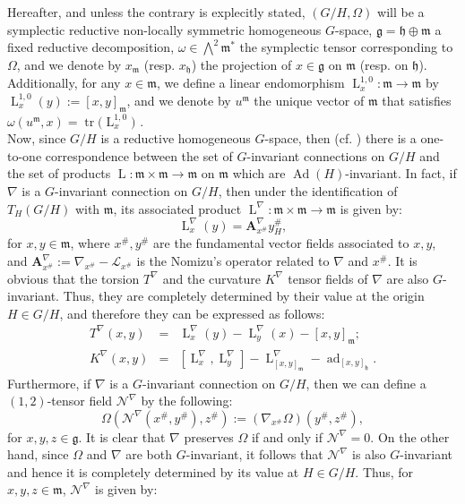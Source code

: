 \documentclass[preprint,12pt,1p]{elsarticle}
\theoremstyle{plain}
\theoremstyle{definition}
\newcommand{\n}{\nabla}
\newcommand{\el}{\operatorname{L}}
\newcommand{\tr}{\operatorname{tr}}
\newcommand{\A}{\mathbf{A}}
\newcommand{\g}{\mathfrak{g}}
\newcommand{\h}{\mathfrak{h}}
\newcommand{\m}{\mathfrak{m}}
\newcommand{\Ad}{\operatorname{Ad}}
\newcommand{\ad}{\operatorname{ad}}
\newcommand{\lN}{\operatorname{L}^\n}
\newcommand{\Ll}{\operatorname{L}}
\newcommand{\lm}{\operatorname{L}^{1,0}}
\numberwithin{equation}{section}
\begin{document}
Hereafter, and unless the contrary is explecitly stated, $(G/H,\Omega)$ will be a symplectic reductive non-locally symmetric homogeneous $G$-space, $\mathfrak{g}=\mathfrak{h}\oplus\mathfrak{m}$ a fixed reductive decomposition, $\omega\in\bigwedge^2\m^*$ the symplectic tensor corresponding to $\Omega$, and we denote by $x_\mathfrak{m}$ (resp. $x_\h$) the projection of $x\in\g$ on $\mathfrak{m}$ (resp. on $\h$). Additionally, for any $x\in\mathfrak{m}$, we define a linear endomorphism $\lm_x:\mathfrak{m}\to\mathfrak{m}$ by $\lm_x(y):=[x,y]_\mathfrak{m}$, and we denote by $u^\mathfrak{m}$ the unique vector of $\m$ that satisfies $\omega\left(u^\mathfrak{m},x\right)=\tr\big(\el_x^{1,0})$ .\\

Now, since $G/H$ is a reductive homogeneous $G$-space, then (cf. \cite{Nom1}) there is a one-to-one correspondence between the set of $G$-invariant connections on $G/H$ and the set of products $\Ll:\mathfrak{m}\times\mathfrak{m}\rightarrow\mathfrak{m}$ on $\m$ which are $\Ad(H)$-invariant. In fact, if $\n$ is a $G$-invariant connection on $G/H$, then under the identification of $T_H(G/H)$ with $\mathfrak{m}$, its associated product $\Ll^\n:\mathfrak{m}\times\mathfrak{m}\rightarrow\mathfrak{m}$ is given by:
\begin{equation}
\Ll^\n_x(y)=\A^\n_{x^\#}y^\#_H,
\end{equation}    
for $x,y\in\mathfrak{m}$, where $x^\#,y^\#$ are the fundamental vector fields associated to $x,y$, and $\A^\n_{x^\#}:=\n_{x^\#}-\mathcal{L}_{x^\#}$ is the Nomizu's operator related to $\n$ and $x^\#$. It is obvious that the torsion $T^\n$ and the curvature $K^\n$ tensor fields of $\n$ are also $G$-invariant. Thus, they are completely determined by their value at the origin $H\in G/H$, and therefore they can be expressed as follows:
\begin{eqnarray}
T^\n(x,y)&=&\lN_x(y)-\lN_y(x)-[x,y]_\m;\label{Tor}\\
K^\n(x,y)&=&\left[\lN_x,\lN_y\right]-\lN_{[x,y]_\mathfrak{m}}-\ad_{[x,y]_\h}.\label{Curv}
\end{eqnarray}
Furthermore, if $\n$ is a $G$-invariant connection on $G/H$, then we can define a $(1,2)$-tensor field $\mathcal{N}^\n$ by the following:
\begin{equation}
\Omega\left(\mathcal{N}^\n(x^\#,y^\#),z^\#\right):=\left(\n_{x^\#}\Omega\right)(y^\#,z^\#),
\end{equation}
for $x,y,z\in\g$. It is clear that $\n$ preserves $\Omega$ if and only if $\mathcal{N}^\n=0$. On the other hand, since $\Omega$ and $\n$ are both $G$-invariant, it follows that $\mathcal{N}^\n$ is also $G$-invariant and hence it is completely determined by its value at $H\in G/H$. Thus, for $x,y,z\in\m$, $\mathcal{N}^\n$ is given by:
\end{document}
